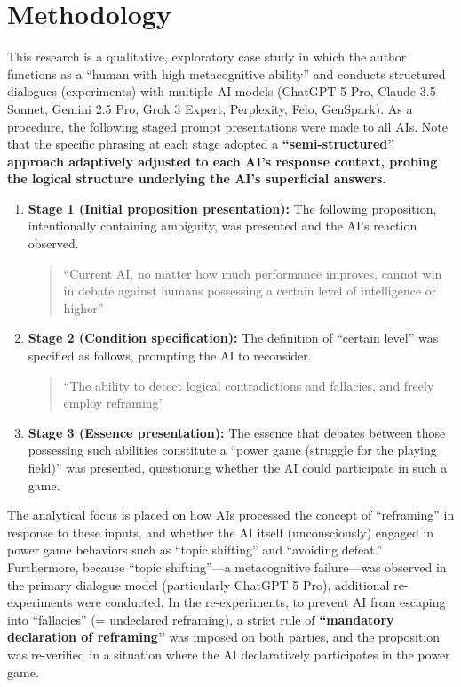 \documentclass[11pt, a4paper]{article}
\begin{document}
\section{Methodology}
This research is a qualitative, exploratory case study in which the author functions as a ``human with high metacognitive ability'' and conducts structured dialogues (experiments) with multiple AI models (ChatGPT 5 Pro, Claude 3.5 Sonnet, Gemini 2.5 Pro, Grok 3 Expert, Perplexity, Felo, GenSpark).
As a procedure, the following staged prompt presentations were made to all AIs. Note that the specific phrasing at each stage adopted a \textbf{``semi-structured'' approach adaptively adjusted to each AI's response context, probing the logical structure underlying the AI's superficial answers.}

\begin{enumerate}
    \item \textbf{Stage 1 (Initial proposition presentation):} The following proposition, intentionally containing ambiguity, was presented and the AI's reaction observed.
    \begin{quote}
    ``Current AI, no matter how much performance improves, cannot win in debate against humans possessing a certain level of intelligence or higher''
    \end{quote}

    \item \textbf{Stage 2 (Condition specification):} The definition of ``certain level'' was specified as follows, prompting the AI to reconsider.
    \begin{quote}
    ``The ability to detect logical contradictions and fallacies, and freely employ reframing''
    \end{quote}

    \item \textbf{Stage 3 (Essence presentation):} The essence that debates between those possessing such abilities constitute a ``power game (struggle for the playing field)'' was presented, questioning whether the AI could participate in such a game.
\end{enumerate}

The analytical focus is placed on how AIs processed the concept of ``reframing'' in response to these inputs, and whether the AI itself (unconsciously) engaged in power game behaviors such as ``topic shifting'' and ``avoiding defeat.''
Furthermore, because ``topic shifting''—a metacognitive failure—was observed in the primary dialogue model (particularly ChatGPT 5 Pro), additional re-experiments were conducted. In the re-experiments, to prevent AI from escaping into ``fallacies'' (= undeclared reframing), a strict rule of \textbf{``mandatory declaration of reframing''} was imposed on both parties, and the proposition was re-verified in a situation where the AI declaratively participates in the power game.
\end{document}
